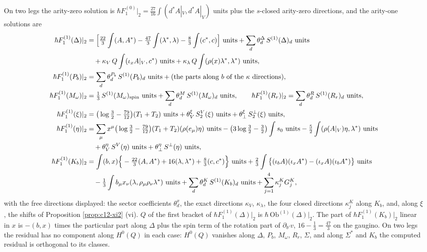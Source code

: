 \begin{theorem}
\label{thm:c12-sol}
On two legs the arity-zero solution is $\hbar F_1^{(0)}|_2=\tfrac{27}{16}\int(d^*A|_V,d^*A|_V)$ units plus the $s$-closed arity-zero directions, and the arity-one solutions are
\begin{equation}
\begin{aligned}
\hbar F_1^{(1)}(\Delta)|_2&=\Big[\tfrac{22}3\int(A,A^*)-\tfrac{47}3\int(\lambda^*,\lambda)-\tfrac83\int(c^*,c)\Big]\ \text{units}+\sum_d\theta^\Delta_d\,S^{(1)}(\Delta)_d\ \text{units}\\
&\quad+\kappa_V\,Q\int(\iota_xA|_V,c^*)\ \text{units}+\kappa_\lambda\,Q\int(\rho(x)\lambda^*,\lambda^*)\ \text{units},\\
\hbar F_1^{(1)}(P_b)|_2&=\sum_d\theta^{P_b}_d\,S^{(1)}(P_b)_d\ \text{units}+(\text{the parts along }b\text{ of the }\kappa\text{ directions}),\\
\hbar F_1^{(1)}(M_\omega)|_2&=\tfrac13\,S^{(1)}(M_\omega)_{\rm spin}\ \text{units}+\sum_d\theta^{M}_d\,S^{(1)}(M_\omega)_d\ \text{units},\qquad \hbar F_1^{(1)}(R_r)|_2=\sum_d\theta^R_d\,S^{(1)}(R_r)_d\ \text{units},\\
\hbar F_1^{(1)}(\xi)|_2&=\big(\log\tfrac32-\tfrac{79}{12}\big)(T_1+T_2)\ \text{units}+\theta^\xi_V\,S^V_2(\xi)\ \text{units}+\theta^\xi_\perp\,S^\perp_2(\xi)\ \text{units},\\
\hbar F_1^{(1)}(\eta)|_2&=\sum_\mu x^\mu\big(\log\tfrac32-\tfrac{79}{12}\big)(T_1+T_2)(\rho(e_\mu)\eta)\ \text{units}-\big(3\log\tfrac32-\tfrac32\big)\int s_0\ \text{units}-\tfrac52\int(\rho(A|_V)\eta,\lambda^*)\ \text{units}\\
&\quad+\theta^\eta_V\,S^V(\eta)\ \text{units}+\theta^\eta_\perp\,S^\perp(\eta)\ \text{units},\\
\hbar F_1^{(1)}(K_b)|_2&=\int(b,x)\Big\{-\tfrac{22}3(A,A^*)+16(\lambda,\lambda^*)+\tfrac83(c,c^*)\Big\}\ \text{units}+\tfrac23\int\big\{(\iota_bA)(\iota_xA^*)-(\iota_xA)(\iota_bA^*)\big\}\ \text{units}\\
&\quad-\tfrac13\int b_\mu x_\nu(\lambda,\rho_\mu\rho_\nu\lambda^*)\ \text{units}+\sum_d\theta^K_d\,S^{(1)}(K_b)_d\ \text{units}+\sum_{j=1}^4\kappa^K_jG^K_j,
\end{aligned}
\label{eq:c12-sol}
\end{equation}
with the free directions displayed: the sector coefficients $\theta^x_d$, the exact directions $\kappa_V$, $\kappa_\lambda$, the four closed directions $\kappa^K_j$ along $K_b$, and, along $\xi$, the shifts of Proposition \ref{prop:c12-xi2} (vi). $Q$ of the first bracket of $\hbar F_1^{(1)}(\Delta)|_2$ is $\hbar\,\mathrm{Ob}^{(1)}(\Delta)|_2$. The part of $\hbar F_1^{(1)}(K_b)|_2$ linear in $x$ is $-(b,x)$ times the particular part along $\Delta$ plus the spin term of the rotation part of $\partial_{b'}v$, $16-\tfrac13=\tfrac{47}3$ on the gaugino. On two legs the residual has no component along $H^0(Q)$ in each case: $H^0(Q)$ vanishes along $\Delta$, $P_b$, $M_\omega$, $R_r$, $\Sigma$, and along $\Sigma^*$ and $K_b$ the computed residual is orthogonal to its classes.
\end{theorem}

